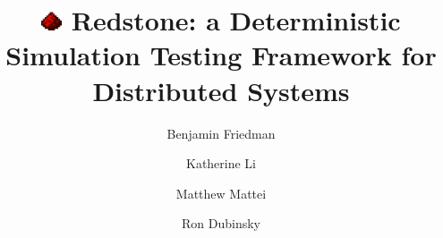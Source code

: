 \usepackage{filecontents}

\usepackage{setspace}
\linespread{1.25}

\newcommand{\vrsdust}[1]{\includegraphics[height=#1]{redstone_dust.png}}

\newcommand{\txtrsdust}{\vrsdust{0.55cm} \hspace{0.1in}}




\date{}

\title{\Large \bf \vrsdust{0.7cm} \hspace{0.1in} Redstone: a Deterministic Simulation Testing Framework for Distributed Systems}

\author{
{\rm Benjamin Friedman}\\
\and
{\rm Katherine Li}\\
\and
{\rm Matthew Mattei}\\
\and
{\rm Ron Dubinsky}\\
} %

\maketitle

